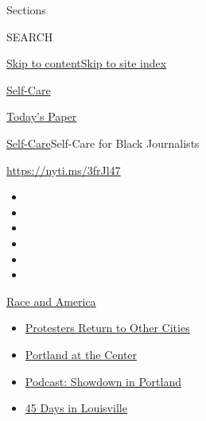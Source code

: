 Sections

SEARCH

\protect\hyperlink{site-content}{Skip to
content}\protect\hyperlink{site-index}{Skip to site index}

\href{https://www.nytimes.com/section/style/self-care/}{Self-Care}

\href{https://myaccount.nytimes.com/auth/login?response_type=cookie\&client_id=vi}{}

\href{https://www.nytimes.com/section/todayspaper}{Today's Paper}

\href{/section/style/self-care/}{Self-Care}\textbar{}Self-Care for Black
Journalists

\url{https://nyti.ms/3frJl47}

\begin{itemize}
\item
\item
\item
\item
\item
\item
\end{itemize}

\href{https://www.nytimes.com/news-event/george-floyd-protests-minneapolis-new-york-los-angeles?action=click\&pgtype=Article\&state=default\&region=TOP_BANNER\&context=storylines_menu}{Race
and America}

\begin{itemize}
\tightlist
\item
  \href{https://www.nytimes.com/2020/07/26/us/protests-portland-seattle-trump.html?action=click\&pgtype=Article\&state=default\&region=TOP_BANNER\&context=storylines_menu}{Protesters
  Return to Other Cities}
\item
  \href{https://www.nytimes.com/2020/07/24/us/portland-oregon-protests-white-race.html?action=click\&pgtype=Article\&state=default\&region=TOP_BANNER\&context=storylines_menu}{Portland
  at the Center}
\item
  \href{https://www.nytimes.com/2020/07/23/podcasts/the-daily/portland-protests.html?action=click\&pgtype=Article\&state=default\&region=TOP_BANNER\&context=storylines_menu}{Podcast:
  Showdown in Portland}
\item
  \href{https://www.nytimes.com/interactive/2020/07/16/us/black-lives-matter-protests-louisville-breonna-taylor.html?action=click\&pgtype=Article\&state=default\&region=TOP_BANNER\&context=storylines_menu}{45
  Days in Louisville}
\end{itemize}

